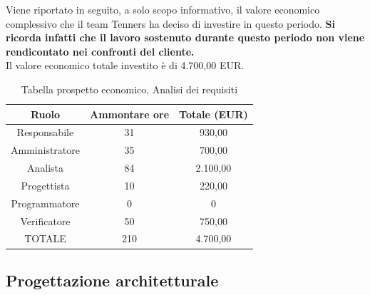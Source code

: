 \noindent Viene riportato in seguito, a solo scopo informativo, il valore economico complessivo che il team Tenners ha deciso di investire in questo periodo.
\noindent \textbf{Si ricorda infatti che il lavoro sostenuto durante questo periodo non viene rendicontato nei confronti del cliente.} \\
Il valore economico totale investito è di 4.700,00 EUR.
\begin{table}[h]
	\caption{Tabella prospetto economico, Analisi dei requisiti}
\begin{center}
\begin{tabular}{ |c|c|c|  }
 \hline
 Ruolo 		& Ammontare ore 	& Totale (EUR)\\
 	\hline
 \hline
 	Responsabile	& 31 	& 930,00\\
	Amministratore	& 35		& 700,00\\
	Analista		& 84 	& 2.100,00\\
	Progettista		& 10		& 220,00\\
	Programmatore	& 0		& 0\\
	Verificatore	& 50		& 750,00\\
 \hline\hline
 TOTALE		& 210		& 4.700,00\\
  \hline
\end{tabular}
\end{center}
\end{table}
\newpage
\subsection{Progettazione architetturale}

